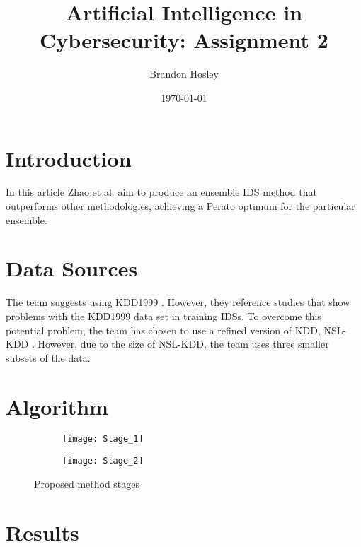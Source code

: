 \documentclass[]{article}
\title{Artificial Intelligence in Cybersecurity: Assignment 2}
\author{Brandon Hosley}
\date{\today}
\begin{document}
	\maketitle
	
\section{Introduction}

In this article \cite{Zhao2020} Zhao et al. aim to produce an ensemble IDS method that outperforms other methodologies, achieving a Perato optimum for the particular ensemble.

\section{Data Sources}

The team suggests using KDD1999 \cite{Kdd1999}. However, they reference studies
\cite{Brown2009, Mchugh2000, Engen2010}
that show problems with the KDD1999 data set in training IDSs.
To overcome this potential problem, the team has chosen to use a refined version of KDD, NSL-KDD \cite{Tavallaee2011}.
However, due to the size of NSL-KDD, the team uses three smaller subsets of the data.

\section{Algorithm}




\begin{figure}[h]
	\centering
	\begin{subfigure}{0.48\linewidth}
		\texttt{[image: Stage\_1]}
	\end{subfigure}
	\hfill
	\begin{subfigure}{0.48\linewidth}
		\texttt{[image: Stage\_2]}
	\end{subfigure}
	\caption{Proposed method stages \cite{Zhao2020}}
\end{figure}


\section{Results}
\end{document}
